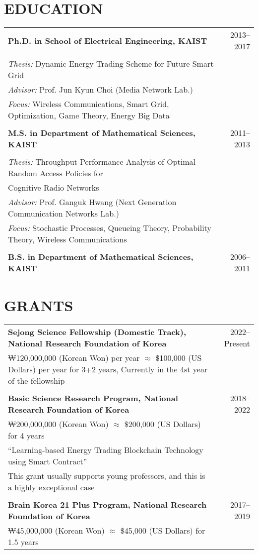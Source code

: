 \documentclass[11pt,a4paper]{article}
\begin{document}
\section{EDUCATION}

\begin{tabular}{p{14cm}r}
\textbf{Ph.D. in School of Electrical Engineering, KAIST} & 2013--2017 \\
\\
\textit{Thesis:} Dynamic Energy Trading Scheme for Future Smart Grid & \\
\textit{Advisor:} Prof. Jun Kyun Choi (Media Network Lab.) & \\
\textit{Focus:} Wireless Communications, Smart Grid, Optimization, Game Theory, Energy Big Data & \\
\\
\textbf{M.S. in Department of Mathematical Sciences, KAIST} & 2011--2013 \\
\\
\textit{Thesis:} Throughput Performance Analysis of Optimal Random Access Policies for & \\
Cognitive Radio Networks & \\
\textit{Advisor:} Prof. Ganguk Hwang (Next Generation Communication Networks Lab.) & \\
\textit{Focus:} Stochastic Processes, Queueing Theory, Probability Theory, Wireless Communications & \\
\\
\textbf{B.S. in Department of Mathematical Sciences, KAIST} & 2006--2011 \\
\end{tabular}

\section{GRANTS}

\begin{tabular}{p{14cm}r}
\textbf{Sejong Science Fellowship (Domestic Track), National Research Foundation of Korea} & 2022--Present \\
₩120,000,000 (Korean Won) per year $\approx$ \$100,000 (US Dollars) per year for 3+2 years, Currently in the 4st year of the fellowship & \\
\\
\textbf{Basic Science Research Program, National Research Foundation of Korea} & 2018--2022 \\
₩200,000,000 (Korean Won) $\approx$ \$200,000 (US Dollars) for 4 years & \\
``Learning-based Energy Trading Blockchain Technology using Smart Contract'' & \\
This grant usually supports young professors, and this is a highly exceptional case & \\
\\
\textbf{Brain Korea 21 Plus Program, National Research Foundation of Korea} & 2017--2019 \\
₩45,000,000 (Korean Won) $\approx$ \$45,000 (US Dollars) for 1.5 years & \\
\end{tabular}
\end{document}
